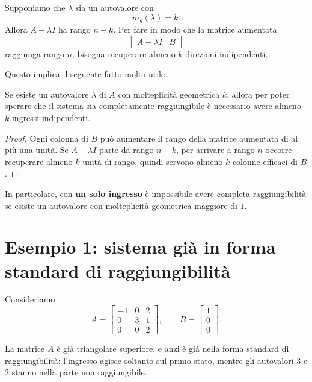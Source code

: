 Supponiamo che \(\lambda\) sia un autovalore con
\[
m_g(\lambda)=k.
\]
Allora \(A-\lambda I\) ha rango \(n-k\). Per fare in modo che la matrice aumentata
\[
\begin{bmatrix}
A-\lambda I & B
\end{bmatrix}
\]
raggiunga rango \(n\), bisogna recuperare almeno \(k\) direzioni indipendenti.

Questo implica il seguente fatto molto utile.

\begin{proposizione}
Se esiste un autovalore \(\lambda\) di \(A\) con molteplicità geometrica \(k\), allora per poter sperare che il sistema sia completamente raggiungibile è necessario avere almeno \(k\) ingressi indipendenti.
\end{proposizione}

\begin{proof}
Ogni colonna di \(B\) può aumentare il rango della matrice aumentata di al più una unità.  
Se \(A-\lambda I\) parte da rango \(n-k\), per arrivare a rango \(n\) occorre recuperare almeno \(k\) unità di rango, quindi servono almeno \(k\) colonne efficaci di \(B\).
\end{proof}

\begin{osservazione}
In particolare, con \textbf{un solo ingresso} è impossibile avere completa raggiungibilità se esiste un autovalore con molteplicità geometrica maggiore di \(1\).
\end{osservazione}

\section{Esempio 1: sistema già in forma standard di raggiungibilità}

Consideriamo
\begin{equation}
A=
\begin{bmatrix}
-1 & 0 & 2\\
0 & 3 & 1\\
0 & 0 & 2
\end{bmatrix},
\qquad
B=
\begin{bmatrix}
1\\
0\\
0
\end{bmatrix}.
\label{eq:L13_es1}
\end{equation}

La matrice \(A\) è già triangolare superiore, e anzi è già nella forma standard di raggiungibilità: l’ingresso agisce soltanto sul primo stato, mentre gli autovalori \(3\) e \(2\) stanno nella parte non raggiungibile.

